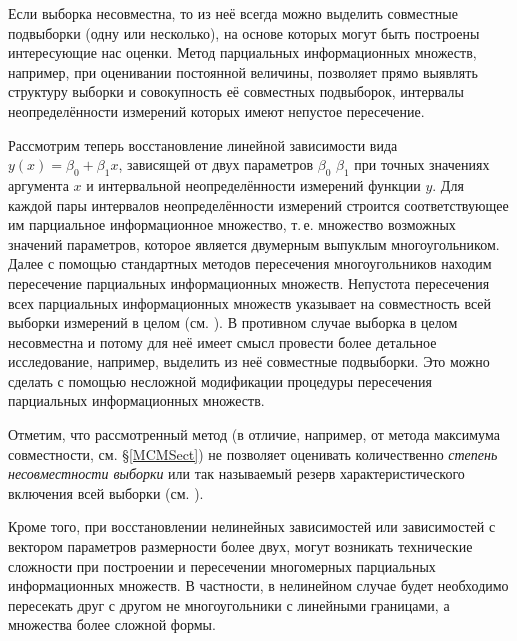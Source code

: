 \documentclass[a5paper,openany]{book}
\begin{document}

Если выборка несовместна, то из неё всегда можно выделить совместные подвыборки 
(одну или несколько), на основе которых могут быть построены интересующие нас оценки. 
Метод парциальных информационных множеств, например, при оценивании постоянной 
величины, позволяет прямо выявлять структуру выборки и совокупность её совместных 
подвыборок, интервалы неопределённости измерений которых имеют непустое пересечение. 
  
Рассмотрим теперь восстановление линейной зависимости вида $y(x) = \beta_{0}+\beta_{1}x$, 
зависящей от двух параметров $\beta_0$ $\beta_1$ при точных значениях аргумента $x$ 
и интервальной неопределённости измерений функции $y$. Для каждой пары интервалов 
неопределённости измерений строится соответствующее им парциальное информационное 
множество, т.\,е. множество возможных значений параметров, которое является двумерным
выпуклым многоугольником. Далее с помощью стандартных методов пересечения 
многоугольников находим пересечение парциальных информационных множеств. Непустота 
пересечения всех парциальных информационных множеств указывает на совместность всей 
выборки измерений в целом (см. \cite{Kumkov2010, KumkovIgnatenkova,Kumkov2013}). 
В противном случае выборка в целом несовместна и потому для неё имеет смысл провести 
более детальное исследование, например, выделить из неё совместные подвыборки. 
Это можно сделать с помощью несложной модификации процедуры пересечения 
парциальных информационных множеств. 
    
Отметим, что рассмотренный метод (в отличие, например, от метода максимума 
совместности, см. \S\ref{MCMSect}) не позволяет оценивать количественно 
\textit{степень несовместности выборки} или так называемый резерв 
характеристического включения всей выборки (см. \cite{SharysReserve}). 

Кроме того, при восстановлении нелинейных зависимостей или 
зависимостей с вектором параметров размерности более двух, могут возникать 
технические сложности при построении и пересечении многомерных парциальных 
информационных множеств. В частности, в нелинейном случае будет необходимо 
пересекать друг с другом не многоугольники с линейными границами, 
а множества более сложной формы. 
   
   
  
\end{document}
